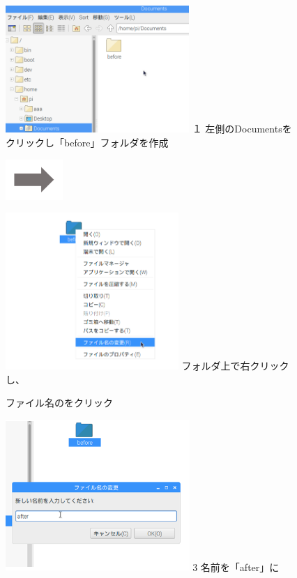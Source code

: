 \documentclass[a4paper,12pt]{jarticle}
\begin{document}
\begin{figure}[ht]
  \begin{minipage}{6.656cm}
    \includegraphics[width=6.96cm]{textbook-img058.png}
    \flushleft
    １
    左側のDocumentsをクリックし「before」フォルダを作成
  \end{minipage}
  \includegraphics[width=2.168cm]{textbook-img052.png}
  \begin{minipage}{5.751cm}
    \includegraphics[width=6.555cm]{textbook-img057.png}
     フォルダ上で右クリックし、

    ファイル名のをクリック
  \end{minipage}

  \begin{minipage}{6.973cm}
    \includegraphics[width=6.973cm]{textbook-img055.png}
    3 名前を「after」に


\end{minipage}
\end{figure}
\end{document}
